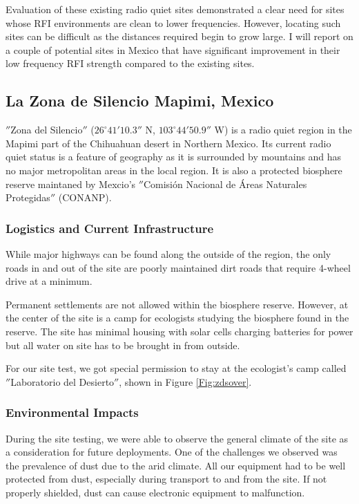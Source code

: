Evaluation of these existing radio quiet sites demonstrated a clear need for sites whose RFI environments are clean to lower frequencies. However, locating such sites can be difficult as the distances required begin to grow large. I will report on a couple of potential sites in Mexico that have significant improvement in their low frequency RFI strength compared to the existing sites. 

\subsection{La Zona de Silencio Mapimi, Mexico}
$''$Zona del Silencio$''$ ($26^\circ 41' 10.3''$ N, $103^\circ 44' 50.9''$ W) is a radio quiet region in the Mapimi part of the Chihuahuan desert in Northern Mexico. Its current radio quiet status is a feature of geography as it is surrounded by mountains and has no major metropolitan areas in the local region. It is also a protected biosphere reserve maintaned by Mexcio's $''$Comisi\'{o}n Nacional de \'{A}reas Naturales Protegidas$''$ (CONANP). 

\subsubsection{Logistics and Current Infrastructure}
While major highways can be found along the outside of the region, the only roads in and out of the site are poorly maintained dirt roads that require 4-wheel drive at a minimum. 

Permanent settlements are not allowed within the biosphere reserve. However, at the center of the site is a camp for ecologists studying the biosphere found in the reserve. The site has minimal housing with solar cells charging batteries for power but all water on site has to be brought in from outside. 

For our site test, we got special permission to stay at the ecologist's camp called $''$Laboratorio del Desierto$''$, shown in Figure \ref{Fig:zdsover}.

\subsubsection{Environmental Impacts}

During the site testing, we were able to observe the general climate of the site as a consideration for future deployments. One of the challenges we observed was the prevalence of dust due to the arid climate. All our equipment had to be well protected from dust, especially during transport to and from the site. If not properly shielded, dust can cause electronic equipment to malfunction. 

